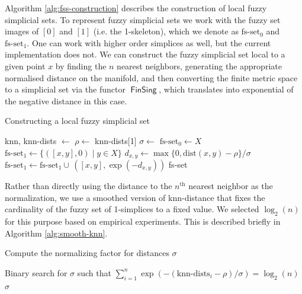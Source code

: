 \documentclass[12pt]{article}
\DeclareMathOperator{\FinSing}{\mathsf{FinSing}}
\begin{document}
Algorithm \ref{alg:fss-construction} describes the construction of local fuzzy simplicial sets. To represent fuzzy simplicial sets we work with the fuzzy set images of $[0]$ and $[1]$ (i.e. the 1-skeleton), which we denote as $\text{fs-set}_0$ and $\text{fs-set}_1$. One can work with higher order simplices as well, but the current implementation does not. We can construct the fuzzy simplicial set local to a given point $x$ by finding the $n$ nearest neighbors, generating the appropriate normalised distance on the manifold, and then converting the finite metric space to a simplicial set via the functor $\FinSing$, which translates into exponential of the negative distance in this case.

\begin{algorithm}[!htbp]
\caption{Constructing a local fuzzy simplicial set}\label{alg:fss-construction}
\begin{algorithmic}[0]
\setlength\baselineskip{18pt}
    \State knn, knn-dists $\gets$ 
    \State $\rho \gets $ knn-dists[1] 
    \State $\sigma \gets $ 
    \State $\text{fs-set}_0 \gets X$
    \State $\text{fs-set}_1 \gets \{([x,y], 0) \mid y \in X\}$
        \State $d_{x,y} \gets \max\{0, \textrm{dist}(x, y) - \rho\}/\sigma$
        \State $\text{fs-set}_1 \gets \text{fs-set}_1 \cup\, ([x, y], \exp(-d_{x,y}))$
    \EndFor
    \State \Return fs-set
\EndFunction\vskip9pt
\end{algorithmic}
\end{algorithm}

Rather than directly using the distance to the $n^\text{th}$ nearest neighbor as the normalization, we use a smoothed version of knn-distance that fixes the cardinality of the fuzzy set of 1-simplices to a fixed value. We selected $\log_2(n)$ for this purpose based on empirical experiments. This is described briefly in Algorithm \ref{alg:smooth-knn}.

\begin{algorithm}[!htbp]
\caption{Compute the normalizing factor for distances $\sigma$}\label{alg:smooth-knn}
\begin{algorithmic}[0]
\setlength\baselineskip{18pt}
    \State Binary search for $\sigma$ such that $\sum_{i=1}^n \exp(-(\text{knn-dists}_i - \rho)/\sigma) = \log_2(n)$
    \State \Return $\sigma$
\EndFunction\vskip9pt
\end{algorithmic}
\end{algorithm}
\end{document}
